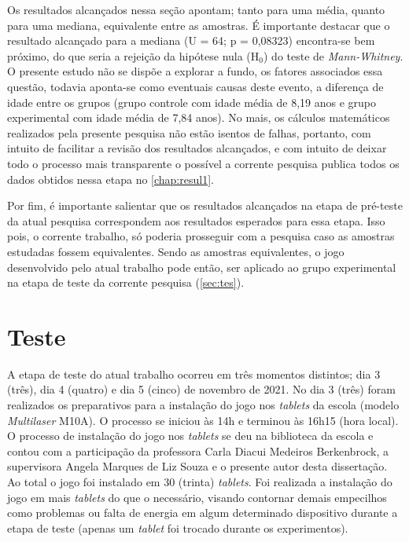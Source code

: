 Os resultados alcançados nessa seção apontam; tanto para uma média, quanto para uma mediana, equivalente entre as amostras. É importante destacar que o resultado alcançado para a mediana (U = 64; p = 0,08323) encontra-se bem próximo, do que seria a rejeição da hipótese nula (H$_0$) do teste de \textit{Mann-Whitney}. O presente estudo não se dispõe a explorar a fundo, os fatores associados essa questão, todavia aponta-se como eventuais causas deste evento, a diferença de idade entre os grupos (grupo controle com idade média de 8,19 anos e grupo experimental com idade média de 7,84 anos). %
No mais, os cálculos matemáticos realizados pela presente pesquisa não estão isentos de falhas, portanto, com intuito de facilitar a revisão dos resultados alcançados, e com intuito de deixar todo o processo mais transparente o possível a corrente pesquisa publica todos os dados obtidos nessa etapa no \autoref{chap:resul1}.

Por fim, é importante salientar que os resultados alcançados na etapa de pré-teste da atual pesquisa correspondem aos resultados esperados para essa etapa. Isso pois, o corrente trabalho, só poderia prosseguir com a pesquisa caso as amostras estudadas fossem equivalentes. Sendo as amostras equivalentes, o jogo desenvolvido pelo atual trabalho pode então, ser aplicado ao grupo experimental na etapa de teste da corrente pesquisa (\autoref{sec:tes}).


\section{Teste}\label{sec:tes}

A etapa de teste do atual trabalho ocorreu em três momentos distintos; dia 3 (três), dia 4 (quatro) e dia 5 (cinco) de novembro de 2021. No dia 3 (três) foram realizados os preparativos para a instalação do jogo nos \textit{tablets} da escola (modelo \textit{Multilaser} M10A). O processo se iniciou às 14h e terminou às 16h15 (hora local). O processo de instalação do jogo nos \textit{tablets} se deu na biblioteca da escola e contou com a participação da professora Carla Diacui Medeiros Berkenbrock, a supervisora Angela Marques de Liz Souza e o presente autor desta dissertação. Ao total o jogo foi instalado em 30 (trinta) \textit{tablets}. Foi realizada a instalação do jogo em mais \textit{tablets} do que o necessário, visando contornar demais empecilhos como problemas ou falta de energia em algum determinado dispositivo durante a etapa de teste (apenas um \textit{tablet} foi trocado durante os experimentos). %

